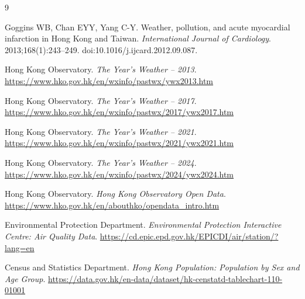 \documentclass[11pt]{article}
\begin{document}
\clearpage
\begin{thebibliography}{9}

Goggins WB, Chan EYY, Yang C-Y.
Weather, pollution, and acute myocardial infarction in Hong Kong and Taiwan.
\textit{International Journal of Cardiology}.
2013;168(1):243--249.
doi:10.1016/j.ijcard.2012.09.087.

Hong Kong Observatory.
\textit{The Year's Weather -- 2013}.
\url{https://www.hko.gov.hk/en/wxinfo/pastwx/ywx2013.htm}

Hong Kong Observatory.
\textit{The Year's Weather -- 2017}.
\url{https://www.hko.gov.hk/en/wxinfo/pastwx/2017/ywx2017.htm}

Hong Kong Observatory.
\textit{The Year's Weather -- 2021}.
\url{https://www.hko.gov.hk/en/wxinfo/pastwx/2021/ywx2021.htm}

Hong Kong Observatory.
\textit{The Year's Weather -- 2024}.
\url{https://www.hko.gov.hk/en/wxinfo/pastwx/2024/ywx2024.htm}

Hong Kong Observatory.
\textit{Hong Kong Observatory Open Data}.
\url{https://www.hko.gov.hk/en/abouthko/opendata_intro.htm}

Environmental Protection Department.
\textit{Environmental Protection Interactive Centre: Air Quality Data}.
\url{https://cd.epic.epd.gov.hk/EPICDI/air/station/?lang=en}

Census and Statistics Department.
\textit{Hong Kong Population: Population by Sex and Age Group}.
\url{https://data.gov.hk/en-data/dataset/hk-censtatd-tablechart-110-01001}

\end{thebibliography}
\end{document}
